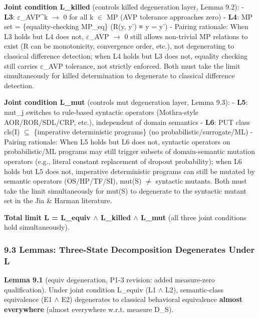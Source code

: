 \documentclass[review,12pt,authoryear]{elsarticle}
\begin{document}
\textbf{Joint condition L\_killed} (controls killed degeneration layer,
Lemma 9.2): - \textbf{L3}: $\varepsilon$\_AVP\^{}k $\to$ 0 for all k $\in$ MP (AVP tolerance
approaches zero) - \textbf{L4}: MP set = \{equality-checking MP\_eq\}
(R(y, y') ≡ y = y') - Pairing rationale: When L3 holds but L4 does not,
$\varepsilon$\_AVP $\to$ 0 still allows non-trivial MP relations to exist (R can be
monotonicity, convergence order, etc.), not degenerating to classical
difference detection; when L4 holds but L3 does not, equality checking
still carries $\varepsilon$\_AVP tolerance, not strictly enforced. Both must take
the limit simultaneously for killed determination to degenerate to
classical difference detection.

\textbf{Joint condition L\_mut} (controls mut degeneration layer, Lemma
9.3): - \textbf{L5}: mut\_j switches to rule-based syntactic operators
(Mothra-style AOR/ROR/SDL/CRP, etc.), independent of domain semantics -
\textbf{L6}: PUT class cls(I) $\subseteq$ \{imperative deterministic programs\}
(no probabilistic/surrogate/ML) - Pairing rationale: When L5 holds but
L6 does not, syntactic operators on probabilistic/ML programs may still
trigger subsets of domain-semantic mutation operators (e.g., literal
constant replacement of dropout probability); when L6 holds but L5 does
not, imperative deterministic programs can still be mutated by semantic
operators (OS/HP/TF/SI), mut(S) $\neq$ syntactic mutants. Both must take the
limit simultaneously for mut(S) to degenerate to the syntactic mutant
set in the Jia \& Harman literature.

\textbf{Total limit L = L\_equiv $\wedge$ L\_killed $\wedge$ L\_mut} (all three joint
conditions hold simultaneously).

\subsubsection{9.3 Lemmas: Three-State Decomposition Degenerates Under
L}\label{lemmas-three-state-decomposition-degenerates-under-l}

\textbf{Lemma 9.1} (equiv degeneration, P1-3 revision: added
measure-zero qualification). Under joint condition L\_equiv (L1 $\wedge$ L2),
semantic-class equivalence (E1 $\wedge$ E2) degenerates to classical behavioral
equivalence \textbf{almost everywhere} (almost everywhere w.r.t. measure
D\_S).
\end{document}
